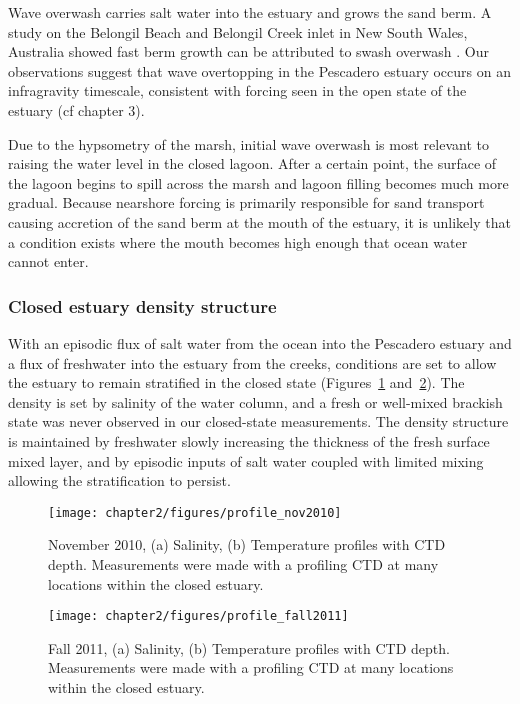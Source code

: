 Wave overwash carries salt water into the estuary and grows the sand berm. A study on the Belongil Beach and Belongil Creek inlet in New South Wales, Australia showed fast berm growth can be attributed to swash overwash \parencite{baldock_morphodynamic_2008}. Our observations suggest that wave overtopping in the Pescadero estuary occurs on an infragravity timescale, consistent with forcing seen in the open state of the estuary (cf chapter 3).

Due to the hypsometry of the marsh, initial wave overwash is most relevant to raising the water level in the closed lagoon. After a certain point, the surface of the lagoon begins to spill across the marsh and lagoon filling becomes much more gradual. Because nearshore forcing is primarily responsible for sand transport causing accretion of the sand berm at the mouth of the estuary, it is unlikely that a condition exists where the mouth becomes high enough that ocean water cannot enter. 


\subsubsection{Closed estuary density structure} \label{cl_strat}

With an episodic flux of salt water from the ocean into the Pescadero estuary and a flux of freshwater into the estuary from the creeks, conditions are set to allow the estuary to remain stratified in the closed state (Figures~\ref{fig:profNov2010} and~\ref{fig:profFall2011}). The density is set by salinity of the water column, and a fresh or well-mixed brackish state was never observed in our closed-state measurements. The density structure is maintained by freshwater slowly increasing the thickness of the fresh surface mixed layer, and by episodic inputs of salt water coupled with limited mixing allowing the stratification to persist. 


\begin{figure}
\centering
	\texttt{[image: chapter2/figures/profile\_nov2010]}
	\caption{November 2010, (a) Salinity, (b) Temperature profiles with CTD depth. Measurements were made with a profiling CTD at many locations within the closed estuary.}
	\label{fig:profNov2010}
\end{figure}


\begin{figure}
\centering
	\texttt{[image: chapter2/figures/profile\_fall2011]}
	\caption{Fall 2011, (a) Salinity, (b) Temperature profiles with CTD depth. Measurements were made with a profiling CTD at many locations within the closed estuary.}
\label{fig:profFall2011}
\end{figure}

